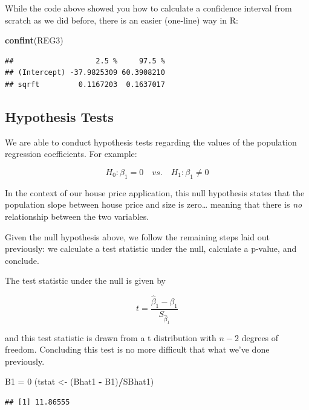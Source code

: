 \documentclass[
]{book}
\newenvironment{Shaded}{\begin{snugshade}}{\end{snugshade}}
\newcommand{\DecValTok}[1]{\textcolor[rgb]{0.00,0.00,0.81}{#1}}
\newcommand{\FunctionTok}[1]{\textcolor[rgb]{0.13,0.29,0.53}{\textbf{#1}}}
\newcommand{\NormalTok}[1]{#1}
\newcommand{\OtherTok}[1]{\textcolor[rgb]{0.56,0.35,0.01}{#1}}
\newcommand{\SpecialCharTok}[1]{\textcolor[rgb]{0.81,0.36,0.00}{\textbf{#1}}}
\begin{document}
While the code above showed you how to calculate a confidence interval from scratch as we did before, there is an easier (one-line) way in R:

\begin{Shaded}
\begin{Highlighting}[]
\FunctionTok{confint}\NormalTok{(REG3)}
\end{Highlighting}
\end{Shaded}

\begin{verbatim}
##                   2.5 %     97.5 %
## (Intercept) -37.9825309 60.3908210
## sqrft         0.1167203  0.1637017
\end{verbatim}

\subsection{Hypothesis Tests}\label{hypothesis-tests}

We are able to conduct hypothesis tests regarding the values of the population regression coefficients. For example:

\[H_0:\beta_1 = 0 \quad vs. \quad H_1:\beta_1 \neq 0\]

In the context of our house price application, this null hypothesis states that the population slope between house price and size is zero\ldots{} meaning that there is \emph{no} relationship between the two variables.

Given the null hypothesis above, we follow the remaining steps laid out previously: we calculate a test statistic under the null, calculate a p-value, and conclude.

The test statistic under the null is given by

\[t=\frac{\hat{\beta}_1 - \beta_1}{S_{\hat{\beta}_1}}\]

and this test statistic is drawn from a t distribution with \(n-2\) degrees of freedom. Concluding this test is no more difficult that what we've done previously.

\begin{Shaded}
\begin{Highlighting}[]
\NormalTok{B1 }\OtherTok{=} \DecValTok{0}
\NormalTok{(tstat }\OtherTok{\textless{}{-}}\NormalTok{ (Bhat1 }\SpecialCharTok{{-}}\NormalTok{ B1)}\SpecialCharTok{/}\NormalTok{SBhat1)}
\end{Highlighting}
\end{Shaded}

\begin{verbatim}
## [1] 11.86555
\end{verbatim}
\end{document}
